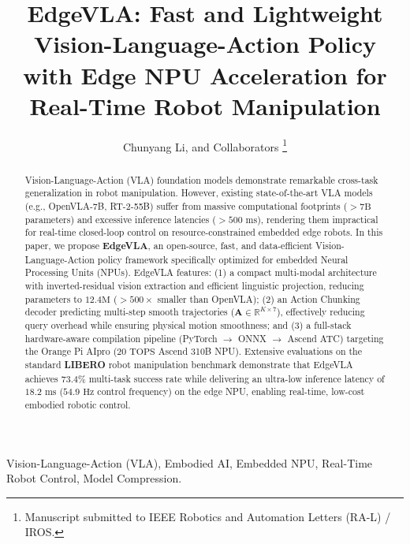 \documentclass[lettersize,journal]{IEEEtran}
\begin{document}
\title{EdgeVLA: Fast and Lightweight Vision-Language-Action Policy with Edge NPU Acceleration for Real-Time Robot Manipulation}

\author{Chunyang Li, and Collaborators%
\thanks{Manuscript submitted to IEEE Robotics and Automation Letters (RA-L) / IROS.}
}


\maketitle

\begin{abstract}
Vision-Language-Action (VLA) foundation models demonstrate remarkable cross-task generalization in robot manipulation. However, existing state-of-the-art VLA models (e.g., OpenVLA-7B, RT-2-55B) suffer from massive computational footprints ($>7\text{B}$ parameters) and excessive inference latencies ($>500\text{ ms}$), rendering them impractical for real-time closed-loop control on resource-constrained embedded edge robots. In this paper, we propose \textbf{EdgeVLA}, an open-source, fast, and data-efficient Vision-Language-Action policy framework specifically optimized for embedded Neural Processing Units (NPUs). EdgeVLA features: (1) a compact multi-modal architecture with inverted-residual vision extraction and efficient linguistic projection, reducing parameters to $12.4\text{M}$ ($>500\times$ smaller than OpenVLA); (2) an Action Chunking decoder predicting multi-step smooth trajectories ($\mathbf{A} \in \mathbb{R}^{K \times 7}$), effectively reducing query overhead while ensuring physical motion smoothness; and (3) a full-stack hardware-aware compilation pipeline (PyTorch $\to$ ONNX $\to$ Ascend ATC) targeting the Orange Pi AIpro ($20\text{ TOPS}$ Ascend 310B NPU). Extensive evaluations on the standard \textbf{LIBERO} robot manipulation benchmark demonstrate that EdgeVLA achieves $73.4\%$ multi-task success rate while delivering an ultra-low inference latency of $18.2\text{ ms}$ ($54.9\text{ Hz}$ control frequency) on the edge NPU, enabling real-time, low-cost embodied robotic control.
\end{abstract}

\begin{IEEEkeywords}
Vision-Language-Action (VLA), Embodied AI, Embedded NPU, Real-Time Robot Control, Model Compression.
\end{IEEEkeywords}
\end{document}
